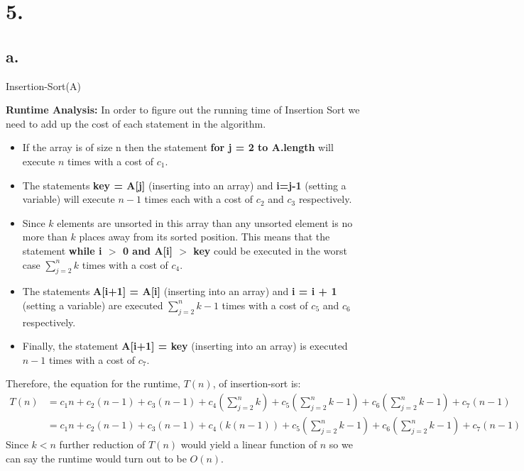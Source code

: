 \documentclass[12pt]{article}
\begin{document}
\section*{5.}
\subsection*{a.}
\begin{algorithm}
\BlankLine
{}
\caption{Insertion-Sort(A)}
\end{algorithm}
\textbf{Runtime Analysis: }In order to figure out the running time of Insertion Sort we need to add up the cost of each statement in the algorithm.\\
\begin{itemize}
\item If the array is of size n then the statement \textbf{for j = 2 to A.length} will execute $n$ times with a cost of $c_1$.\\
\item The statements \textbf{key = A[j]} (inserting into an array) and \textbf{i=j-1} (setting a variable) will execute $n-1$ times each with a cost of $c_2$ and $c_3$ respectively.\\
\item Since $k$ elements are unsorted in this array than any unsorted element is no more than $k$ places away from its sorted position.  This means that the statement \textbf{while i $>$ 0 and A[i] $>$ key} could be executed in the worst case $\sum_{j=2}^{n} k$ times with a cost of $c_4$.\\
\item The statements \textbf{A[i+1] = A[i]} (inserting into an array) and \textbf{i = i + 1} (setting a variable) are executed $\sum_{j=2}^{n} k - 1$ times with a cost of $c_5$ and $c_6$ respectively.\\
\item Finally, the statement \textbf{A[i+1] = key} (inserting into an array) is executed $n-1$ times with a cost of $c_7$.\\
\end{itemize}
Therefore, the equation for the runtime, $T(n)$, of insertion-sort is:\\
\begin{align*}
T(n)  & = c_1n + c_2(n-1) + c_3(n-1) + c_4(\sum_{j=2}^{n} k) + c_5(\sum_{j=2}^{n} k - 1) + c_6(\sum_{j=2}^{n} k - 1) + c_7(n-1)\\
	& = c_1n + c_2(n-1) + c_3(n-1) + c_4(k(n-1)) + c_5(\sum_{j=2}^{n} k - 1) + c_6(\sum_{j=2}^{n} k - 1) + c_7(n-1)
\end{align*}
Since $k < n$ further reduction of $T(n)$ would yield a linear function of $n$ so we can say the runtime would turn out to be $O(n)$.
\end{document}
